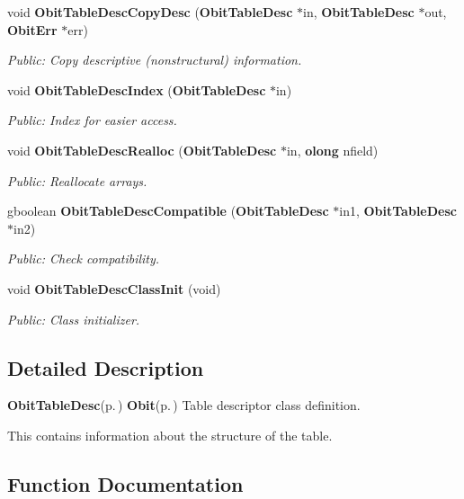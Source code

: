 \begin{CompactItemize}
void {\bf Obit\-Table\-Desc\-Copy\-Desc} ({\bf Obit\-Table\-Desc} $\ast$in, {\bf Obit\-Table\-Desc} $\ast$out, {\bf Obit\-Err} $\ast$err)
\begin{CompactList}\small\item\em Public: Copy descriptive (nonstructural) information. \item\end{CompactList}\item 
void {\bf Obit\-Table\-Desc\-Index} ({\bf Obit\-Table\-Desc} $\ast$in)
\begin{CompactList}\small\item\em Public: Index for easier access. \item\end{CompactList}\item 
void {\bf Obit\-Table\-Desc\-Realloc} ({\bf Obit\-Table\-Desc} $\ast$in, {\bf olong} nfield)
\begin{CompactList}\small\item\em Public: Reallocate arrays. \item\end{CompactList}\item 
gboolean {\bf Obit\-Table\-Desc\-Compatible} ({\bf Obit\-Table\-Desc} $\ast$in1, {\bf Obit\-Table\-Desc} $\ast$in2)
\begin{CompactList}\small\item\em Public: Check compatibility. \item\end{CompactList}\item 
void {\bf Obit\-Table\-Desc\-Class\-Init} (void)
\begin{CompactList}\small\item\em Public: Class initializer. \item\end{CompactList}\end{CompactItemize}


\subsection{Detailed Description}
{\bf Obit\-Table\-Desc}{\rm (p.\,\pageref{structObitTableDesc})} {\bf Obit}{\rm (p.\,\pageref{structObit})} Table descriptor class definition. 

This contains information about the structure of the table.

\subsection{Function Documentation}
